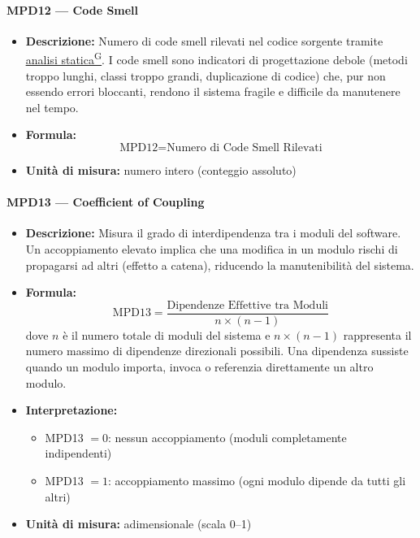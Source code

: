\documentclass[a4paper,12pt]{article}
\providecommand{\glslink}[2]{\href{https://alittlebyte-19.github.io/Documentazione/glossario.html\#gls-#1}{\underline{#2}\textsuperscript{\scriptsize G}}}
\begin{document}
\paragraph{MPD12 --- Code Smell}
\begin{itemize}
    \item \textbf{Descrizione:} Numero di code smell rilevati nel codice sorgente tramite \glslink{analisi-statica}{analisi statica}. I code smell sono indicatori di progettazione debole (metodi troppo lunghi, classi troppo grandi, duplicazione di codice) che, pur non essendo errori bloccanti, rendono il sistema fragile e difficile da manutenere nel tempo.
    \item \textbf{Formula:}
    $$\text{MPD12} = \text{Numero di Code Smell Rilevati}$$
    \item \textbf{Unità di misura:} numero intero (conteggio assoluto)
\end{itemize}

\paragraph{MPD13 --- Coefficient of Coupling}
\begin{itemize}
    \item \textbf{Descrizione:} Misura il grado di interdipendenza tra i moduli del software. Un accoppiamento elevato implica che una modifica in un modulo rischi di propagarsi ad altri (effetto a catena), riducendo la manutenibilità del sistema.
    \item \textbf{Formula:}
    $$\text{MPD13} = \frac{\text{Dipendenze Effettive tra Moduli}}{n \times (n - 1)}$$
    dove $n$ è il numero totale di moduli del sistema e $n \times (n-1)$ rappresenta il numero massimo di dipendenze direzionali possibili. Una dipendenza sussiste quando un modulo importa, invoca o referenzia direttamente un altro modulo.
    \item \textbf{Interpretazione:}
    \begin{itemize}
        \item MPD13 $= 0$: nessun accoppiamento (moduli completamente indipendenti)
        \item MPD13 $= 1$: accoppiamento massimo (ogni modulo dipende da tutti gli altri)
    \end{itemize}
    \item \textbf{Unità di misura:} adimensionale (scala 0--1)
\end{itemize}
\end{document}

